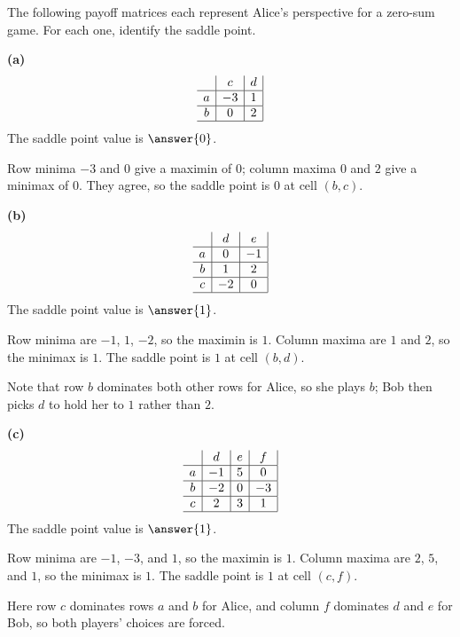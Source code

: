 \documentclass[12pt]{ximera}
\begin{document}
\begin{problem}
The following payoff matrices each represent Alice's perspective for a zero-sum game.
For each one, identify the saddle point.

\begin{prompt}
\textbf{(a)}
\[
\begin{array}{c|c|c|}
\phantom{|} & c & d \\\hline
a & -3 & 1 \\\hline
b & 0 & 2 \\\hline
\end{array}
\]
The saddle point value is $\answer{0}$.

\begin{feedback}
Row minima $-3$ and $0$ give a maximin of $0$; column maxima $0$ and $2$ give a minimax
of $0$. They agree, so the saddle point is $0$ at cell $(b,c)$.
\end{feedback}
\end{prompt}

\begin{prompt}
\textbf{(b)}
\[
\begin{array}{c|c|c|}
\phantom{|} & d & e \\\hline
a & 0 & -1 \\\hline
b & 1 & 2 \\\hline
c & -2 & 0 \\\hline
\end{array}
\]
The saddle point value is $\answer{1}$.

\begin{feedback}
Row minima are $-1$, $1$, $-2$, so the maximin is $1$. Column maxima are $1$ and $2$, so
the minimax is $1$. The saddle point is $1$ at cell $(b,d)$.

Note that row $b$ dominates both other rows for Alice, so she plays $b$; Bob then picks
$d$ to hold her to $1$ rather than $2$.
\end{feedback}
\end{prompt}

\begin{prompt}
\textbf{(c)}
\[
\begin{array}{c|c|c|c|}
\phantom{|} & d & e & f \\\hline
a & -1 & 5 & 0 \\\hline
b & -2 & 0 & -3 \\\hline
c & 2 & 3 & 1 \\\hline
\end{array}
\]
The saddle point value is $\answer{1}$.

\begin{feedback}
Row minima are $-1$, $-3$, and $1$, so the maximin is $1$. Column maxima are $2$, $5$,
and $1$, so the minimax is $1$. The saddle point is $1$ at cell $(c,f)$.

Here row $c$ dominates rows $a$ and $b$ for Alice, and column $f$ dominates $d$ and $e$
for Bob, so both players' choices are forced.
\end{feedback}
\end{prompt}
\end{problem}
\end{document}

